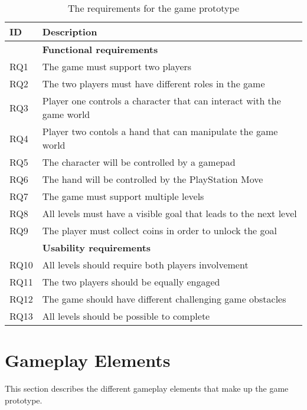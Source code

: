 \begin{table}[!ht]
	\centering
	\caption{The requirements for the game prototype}
	\label{tab:requirements}
	\begin{tabular}{|l|l|}
		\hline
		\textbf{ID} & \textbf{Description}                                                  \\ \hline
		            & \textbf{Functional requirements}                                      \\ \hline
		RQ1         & The game must support two players                                     \\
		RQ2         & The two players must have different roles in the game                 \\
		RQ3         & Player one controls a character that can interact with the game world \\
		RQ4         & Player two contols a hand that can manipulate the game world          \\
		RQ5         & The character will be controlled by a gamepad                         \\
		RQ6         & The hand will be controlled by the PlayStation Move                   \\
		RQ7         & The game must support multiple levels                                 \\
		RQ8         & All levels must have a visible goal that leads to the next level      \\
		RQ9         & The player must collect coins in order to unlock the goal             \\ \hline
		            & \textbf{Usability requirements}                                       \\ \hline
		RQ10        & All levels should require both players involvement                    \\
		RQ11        & The two players should be equally engaged                             \\
		RQ12        & The game should have different challenging game obstacles             \\
		RQ13        & All levels should be possible to complete                             \\ \hline
	\end{tabular}
\end{table}

\section{Gameplay Elements}
\label{sec:gameplay_elements}
This section describes the different gameplay elements that make up the game prototype.

